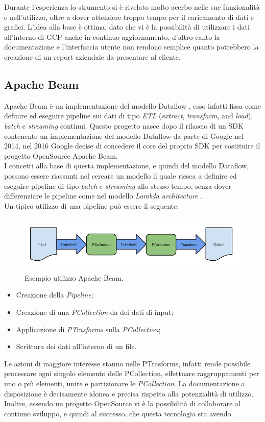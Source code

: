 Durante l'esperienza lo strumento si è rivelato molto acerbo nelle sue funzionalità e nell'utilizzo, oltre a dover attendere troppo tempo per il caricamento di dati e grafici. L'idea alla base è ottima, dato che vi è la possibilità di utilizzare i dati all'interno di GCP anche in continuo aggiornamento, d'altro canto la documentazione e l'interfaccia utente non rendono semplice quanto potrebbero la creazione di un report aziendale da presentare al cliente.	
\subsection{Apache Beam}
Apache Beam è un implementazione del modello Dataflow \cite{modelloDataflow}, esso infatti fissa come definire ed eseguire pipeline sui dati di tipo \emph{ETL} (\emph{extract}, \emph{transform}, and \emph{load}), \emph{batch} e \emph{streaming} continui. Questo progetto nasce dopo il rilascio di un \gls{SDK} contenente un implementazione del modello Dataflow da parte di Google nel 2014, nel 2016 Google decise di concedere il core del proprio SDK per costituire il progetto \Gls{OpenSource} Apache Beam.
\\ I concetti alla base di questa implementazione, e quindi del modello Dataflow, possono essere riassunti nel cercare un modello il quale riesca a definire ed eseguire pipeline di tipo \emph{batch} e \emph{streaming} allo stesso tempo, senza dover differenziare le pipeline come nel modello \emph{Lambda architecture} \cite{Lambdaarchitecture}.
\\ Un tipico utilizzo di una pipeline può essere il seguente:
\begin{figure}[h!]
	\centering
	\includegraphics[scale=0.5]{figures/design-your-pipeline-linear}
	\caption[Esempio utilizzo Apache Beam. ]{Esempio utilizzo Apache Beam.
		\label{fig:beam}}
\end{figure}	
\begin{itemize}
	\item Creazione della \emph{Pipeline};
	\item Creazione di una \emph{PCollection} da dei dati di input;
	\item Applicazione di \emph{PTrasforms} sulla \emph{PCollection};
	\item Scrittura dei dati all'interno di un file.
\end{itemize}
Le azioni di maggiore interesse stanno nelle PTrasforms, infatti rende possibile processare ogni singolo elemento delle PCollection, effettuare raggruppamenti per uno o più elementi, unire  e partizionare le \emph{PCollection}.
La documentazione a disposizione è decisamente idonea e precisa rispetto alla potenzialità di utilizzo. Inoltre, essendo un progetto OpenSource vi è la possibilità di collaborare al continuo sviluppo, e quindi al successo, che questa tecnologia sta avendo.
